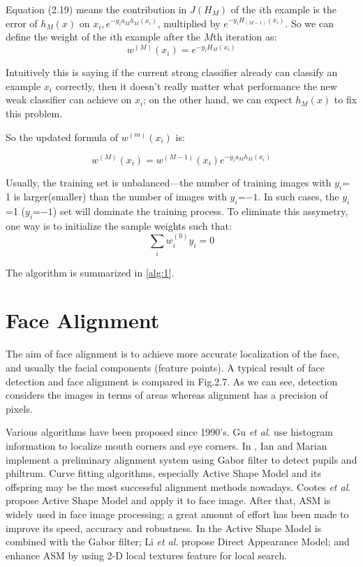 \documentclass[12pt]{report}
\begin{document}
\par
Equation (2.19) means the contribution in $J(H_M)$ of the $i$th example is the error of $h_M(x)$ on $x_i, e^{-y_ia_Mh_M(x_i)}$, multiplied by $e^{-y_iH_{(M-1)}(x_i)}$. So we can define the weight of the $i$th example after the $M$th iteration as:
\begin{equation}
	w^{(M)}(x_i) = e^{-y_iH_M(x_i)}
	\label{eqn:2.20}
\end{equation}
\par
	Intuitively this is saying if the current strong classifier already can classify an example $x_i$ correctly, then it doesn’t really matter what performance the new weak classifier can achieve on $x_i$; on the other hand, we can expect $h_M(x)$ to fix this problem.
\par
	
So the updated formula of $w^{(m)}(x_i)$ is:

\begin{equation}
	w^{(M)}(x_i) = w^{(M-1)}(x_i)e^{-y_ia_Mh_M(x_i)}
	\label{eqn:2.21}
\end{equation}

\par	
Usually, the training set is unbalanced—the number of training images with $y_i$= 1 is larger(smaller) than the number of images with $y_i$=$-1$. In such cases, the $y_i$=1 ($y_i$=$-1$) set will dominate the training process. To eliminate this assymetry, one way is to initialize the sample weights such that:
\begin{equation}
	\sum_{i}w_i^{(0)} y_i=0
	\label{eqn:2.23}
\end{equation}
\par
The algorithm is summarized in \ref{alg:1}.
			
\section{Face Alignment}
The aim of face alignment is to achieve more accurate localization of the face, and usually the facial components (feature points). A typical result of face detection and face alignment is compared in Fig.2.7. As we can see, detection considers the images in terms of areas whereas alignment has a precision of pixels.
\par
Various algorithms have been proposed since 1990's. Gu \textit{ et al}. \cite{29} use histogram information to localize mouth corners and eye corners. In \cite{26}, Ian and Marian implement a preliminary alignment system using Gabor filter to detect pupils and philtrum. Curve fitting algorithms, especially Active Shape Model \cite{18} and its offspring may be the most successful alignment methods nowadays. Cootes \textit{ et al}. \cite{18} \cite{45} \cite{16} propose Active Shape Model and apply it to face image. After that, ASM is widely used in face image processing; a great amount of effort has been made to improve its speed, accuracy and robustness. In \cite{36} the Active Shape Model is combined with the Gabor filter; Li \textit{ et al}. \cite{78} propose Direct Appearance Model; \cite{56} and \cite{101} enhance ASM by using 2-D local textures feature for local search. 
\end{document}
